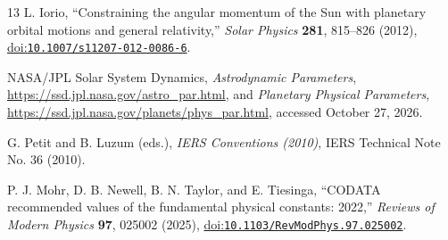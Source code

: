 \documentclass[12pt]{article}
\begin{document}
\begin{thebibliography}{13}
L. Iorio,
``Constraining the angular momentum of the Sun with planetary orbital motions and general relativity,''
\emph{Solar Physics} \textbf{281}, 815--826 (2012),
\href{https://doi.org/10.1007/s11207-012-0086-6}{doi:\nolinkurl{10.1007/s11207-012-0086-6}}.

NASA/JPL Solar System Dynamics,
\emph{Astrodynamic Parameters},
\url{https://ssd.jpl.nasa.gov/astro_par.html}, and
\emph{Planetary Physical Parameters},
\url{https://ssd.jpl.nasa.gov/planets/phys_par.html},
accessed October 27, 2026.

G. Petit and B. Luzum (eds.),
\emph{IERS Conventions (2010)}, IERS Technical Note No. 36 (2010).

P. J. Mohr, D. B. Newell, B. N. Taylor, and E. Tiesinga,
``CODATA recommended values of the fundamental physical constants: 2022,''
\emph{Reviews of Modern Physics} \textbf{97}, 025002 (2025),
\href{https://doi.org/10.1103/RevModPhys.97.025002}{doi:\nolinkurl{10.1103/RevModPhys.97.025002}}.

\end{thebibliography}
\end{document}
